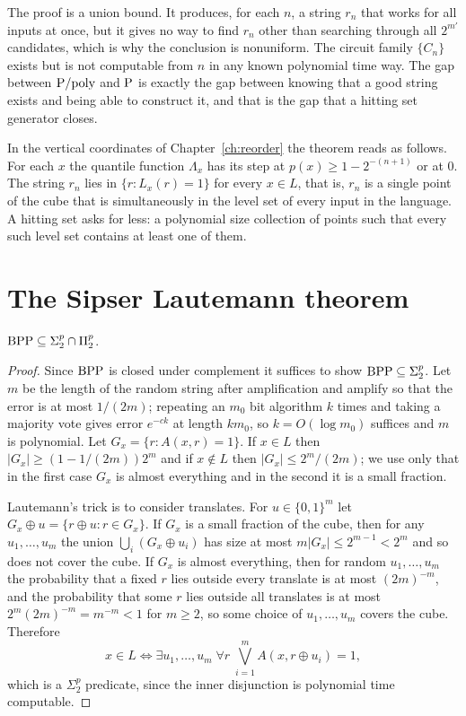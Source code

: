 The proof is a union bound. It produces, for each $n$, a string $r_n$ that works for all inputs at once, but it gives no way to find $r_n$ other than searching through all $2^{m'}$ candidates, which is why the conclusion is nonuniform. The circuit family $\{C_n\}$ exists but is not computable from $n$ in any known polynomial time way. The gap between $\mathrm{P}/\mathrm{poly}$ and $\mathrm{P}$ is exactly the gap between knowing that a good string exists and being able to construct it, and that is the gap that a hitting set generator closes.

In the vertical coordinates of Chapter~\ref{ch:reorder} the theorem reads as follows. For each $x$ the quantile function $\Lambda_x$ has its step at $p(x) \ge 1 - 2^{-(n+1)}$ or at $0$. The string $r_n$ lies in $\{ r : L_x(r) = 1 \}$ for every $x \in L$, that is, $r_n$ is a single point of the cube that is simultaneously in the level set of every input in the language. A hitting set asks for less: a polynomial size collection of points such that every such level set contains at least one of them.

\section{The Sipser Lautemann theorem}

\begin{theorem}
$\mathrm{BPP} \subseteq \Sigma_2^p \cap \Pi_2^p$.
\end{theorem}

\begin{proof}
Since $\mathrm{BPP}$ is closed under complement it suffices to show $\mathrm{BPP} \subseteq \Sigma_2^p$. Let $m$ be the length of the random string after amplification and amplify so that the error is at most $1/(2m)$; repeating an $m_0$ bit algorithm $k$ times and taking a majority vote gives error $e^{-ck}$ at length $k m_0$, so $k = O(\log m_0)$ suffices and $m$ is polynomial. Let $G_x = \{ r : A(x, r) = 1 \}$. If $x \in L$ then $|G_x| \ge (1 - 1/(2m)) 2^m$ and if $x \notin L$ then $|G_x| \le 2^m / (2m)$; we use only that in the first case $G_x$ is almost everything and in the second it is a small fraction.

Lautemann's trick is to consider translates. For $u \in \{0,1\}^m$ let $G_x \oplus u = \{ r \oplus u : r \in G_x \}$. If $G_x$ is a small fraction of the cube, then for any $u_1, \dots, u_m$ the union $\bigcup_i (G_x \oplus u_i)$ has size at most $m |G_x| \le 2^{m-1} < 2^m$ and so does not cover the cube. If $G_x$ is almost everything, then for random $u_1, \dots, u_m$ the probability that a fixed $r$ lies outside every translate is at most $(2m)^{-m}$, and the probability that some $r$ lies outside all translates is at most $2^m (2m)^{-m} = m^{-m} < 1$ for $m \ge 2$, so some choice of $u_1, \dots, u_m$ covers the cube. Therefore
\[
x \in L \iff \exists u_1, \dots, u_m \; \forall r \; \bigvee_{i=1}^{m} A(x, r \oplus u_i) = 1 ,
\]
which is a $\Sigma_2^p$ predicate, since the inner disjunction is polynomial time computable.
\end{proof}

